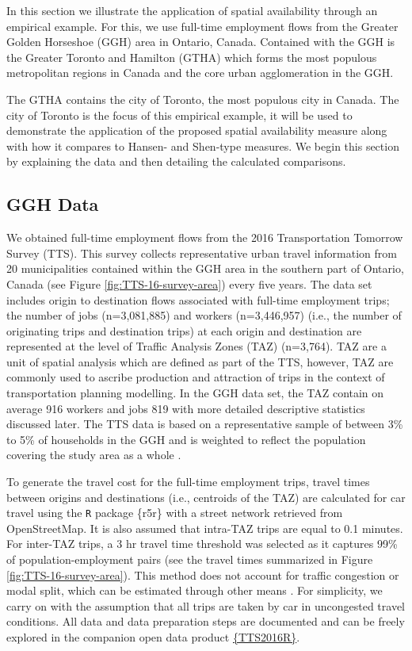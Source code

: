 \documentclass[]{elsarticle} %
\begin{document}
In this section we illustrate the application of spatial availability
through an empirical example. For this, we use full-time employment
flows from the Greater Golden Horseshoe (GGH) area in Ontario, Canada.
Contained with the GGH is the Greater Toronto and Hamilton (GTHA) which
forms the most populous metropolitan regions in Canada and the core
urban agglomeration in the GGH.

The GTHA contains the city of Toronto, the most populous city in Canada.
The city of Toronto is the focus of this empirical example, it will be
used to demonstrate the application of the proposed spatial availability
measure along with how it compares to Hansen- and Shen-type measures. We
begin this section by explaining the data and then detailing the
calculated comparisons.

\hypertarget{ggh-data}{%
\subsection{GGH Data}\label{ggh-data}}

We obtained full-time employment flows from the 2016 Transportation
Tomorrow Survey (TTS). This survey collects representative urban travel
information from 20 municipalities contained within the GGH area in the
southern part of Ontario, Canada (see Figure
\ref{fig:TTS-16-survey-area}) \citep{data_management_group_tts_2018}
every five years. The data set includes origin to destination flows
associated with full-time employment trips; the number of jobs
(n=3,081,885) and workers (n=3,446,957) (i.e., the number of originating
trips and destination trips) at each origin and destination are
represented at the level of Traffic Analysis Zones (TAZ) (n=3,764). TAZ
are a unit of spatial analysis which are defined as part of the TTS,
however, TAZ are commonly used to ascribe production and attraction of
trips in the context of transportation planning modelling. In the GGH
data set, the TAZ contain on average 916 workers and jobs 819 with more
detailed descriptive statistics discussed later. The TTS data is based
on a representative sample of between 3\% to 5\% of households in the
GGH and is weighted to reflect the population covering the study area as
a whole \citep{data_management_group_tts_2018}.

To generate the travel cost for the full-time employment trips, travel
times between origins and destinations (i.e., centroids of the TAZ) are
calculated for car travel using the \texttt{R} package \{r5r\}
\citep{r5r_2021} with a street network retrieved from OpenStreetMap. It
is also assumed that intra-TAZ trips are equal to 0.1 minutes. For
inter-TAZ trips, a 3 hr travel time threshold was selected as it
captures 99\% of population-employment pairs (see the travel times
summarized in Figure \ref{fig:TTS-16-survey-area}). This method does not
account for traffic congestion or modal split, which can be estimated
through other means
\citep[e.g.,][]{allen_suburbanization_2021, higgins2021changes}. For
simplicity, we carry on with the assumption that all trips are taken by
car in uncongested travel conditions. All data and data preparation
steps are documented and can be freely explored in the companion open
data product \href{https://soukhova.github.io/TTS2016R/}{\{TTS2016R\}}.
\end{document}
